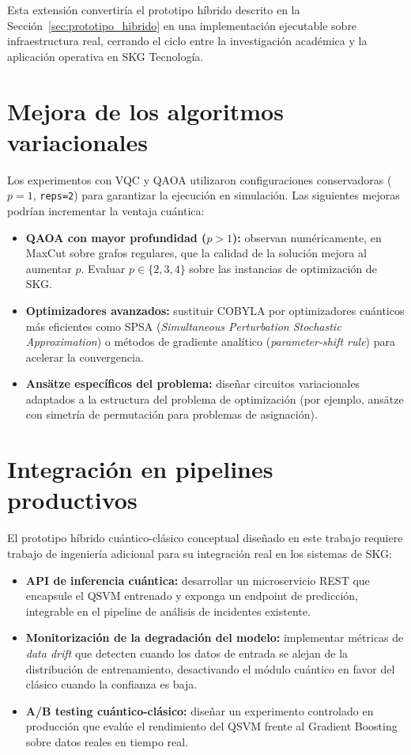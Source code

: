 Esta extensión convertiría el prototipo híbrido descrito en la Sección~\ref{sec:prototipo_hibrido} en una implementación ejecutable sobre infraestructura real, cerrando el ciclo entre la investigación académica y la aplicación operativa en SKG Tecnología.

\section{Mejora de los algoritmos variacionales}

Los experimentos con VQC y QAOA utilizaron configuraciones conservadoras ($p=1$, \texttt{reps=2}) para garantizar la ejecución en simulación. Las siguientes mejoras podrían incrementar la ventaja cuántica:

\begin{itemize}
    \item \textbf{QAOA con mayor profundidad ($p > 1$):} \citet{zhou2020} observan numéricamente, en MaxCut sobre grafos regulares, que la calidad de la solución mejora al aumentar $p$. Evaluar $p \in \{2, 3, 4\}$ sobre las instancias de optimización de SKG.
    \item \textbf{Optimizadores avanzados:} sustituir COBYLA por optimizadores cuánticos más eficientes como SPSA (\textit{Simultaneous Perturbation Stochastic Approximation}) o métodos de gradiente analítico (\textit{parameter-shift rule}) para acelerar la convergencia.
    \item \textbf{Ansätze específicos del problema:} diseñar circuitos variacionales adaptados a la estructura del problema de optimización (por ejemplo, ansätze con simetría de permutación para problemas de asignación).
\end{itemize}

\section{Integración en pipelines productivos}

El prototipo híbrido cuántico-clásico conceptual diseñado en este trabajo requiere trabajo de ingeniería adicional para su integración real en los sistemas de SKG:

\begin{itemize}
    \item \textbf{API de inferencia cuántica:} desarrollar un microservicio REST que encapsule el QSVM entrenado y exponga un endpoint de predicción, integrable en el pipeline de análisis de incidentes existente.
    \item \textbf{Monitorización de la degradación del modelo:} implementar métricas de \textit{data drift} que detecten cuando los datos de entrada se alejan de la distribución de entrenamiento, desactivando el módulo cuántico en favor del clásico cuando la confianza es baja.
    \item \textbf{A/B testing cuántico-clásico:} diseñar un experimento controlado en producción que evalúe el rendimiento del QSVM frente al Gradient Boosting sobre datos reales en tiempo real.
\end{itemize}

